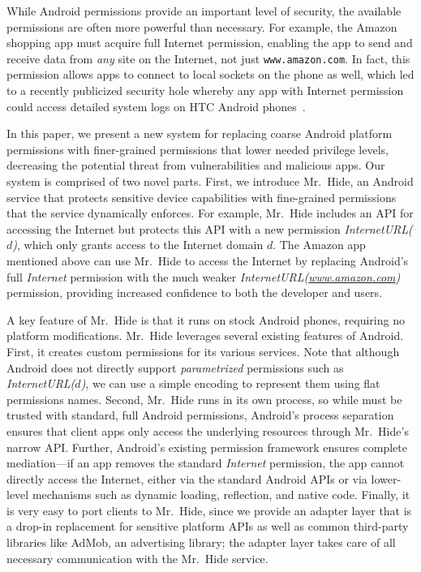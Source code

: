 \documentclass[preprint]{sig-alternate-10pt}
\newcommand{\lib}{Mr.\ Hide\xspace}
\newcommand{\perm}[1]{\textsf{\textit{#1}}}
\newcommand{\comment}[3][\color{red}]{}%
\newcommand{\tdm}[1]{\comment[\color{red}]{TDM}{#1}}
\begin{document}
While Android permissions provide an important level of security, the
available permissions are often more powerful than necessary. For
example, the Amazon shopping app must acquire full Internet
permission, enabling the app to send and receive data from \emph{any}
site on the Internet, not just {\tt www.amazon.com}. In fact, this
permission allows apps to connect to local sockets on the phone as
well, which led to a recently publicized security hole whereby
any app with Internet permission could access detailed system logs on HTC
Android phones~\cite{website:htc-logger}.

In this paper, we present a new system for replacing coarse Android
platform permissions with finer-grained permissions that lower needed
privilege levels, decreasing the potential threat from vulnerabilities
and malicious apps. Our system is comprised of two novel parts.
First, we introduce \lib, an Android service that protects sensitive device capabilities with
fine-grained permissions that the service dynamically enforces.  For example, \lib includes an API for
accessing the Internet but protects this API with a new permission
\perm{InternetURL($d$)}, which only grants access to the Internet
domain $d$.  The Amazon app mentioned above can use \lib to access the
Internet by replacing Android's full
\perm{Internet} permission
with the much weaker
\perm{InternetURL(\url{www.amazon.com})} permission, providing
increased confidence to both the developer and users.

A key feature of \lib is that it
runs on stock Android phones, requiring no platform
modifications. 
\lib leverages several existing
features of Android.  First, it creates custom permissions for its
various services. Note that although
Android does not directly support \emph{parametrized} permissions
such as \perm{InternetURL($d$)}, we can use a simple encoding to
represent them using flat permissions names.
Second, 
\lib runs in its own process, so while must be trusted with standard, full
Android permissions, Android's process separation ensures
that client apps only access the underlying resources through \lib's
narrow API.  
Further, Android's existing 
permission framework ensures complete mediation---if an app removes the
standard \perm{Internet} permission, the app cannot directly access the
Internet, either via the standard Android APIs or via lower-level
mechanisms such as
dynamic loading, reflection,
and native code.  %
Finally,
it is very easy to port clients to \lib, since we
provide an
adapter layer that is a drop-in replacement for sensitive platform
APIs as well as common third-party libraries like AdMob, an advertising
library; the adapter layer takes care of all necessary communication
with the \lib service.
\end{document}
